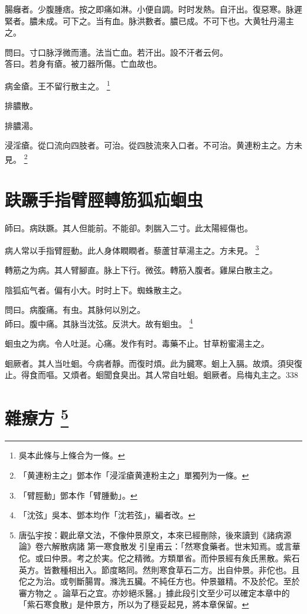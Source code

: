 腸癰者。少腹腫痞。按之即痛如淋。小便自調。时时发熱。自汗出。復惡寒。脉遲緊者。膿未成。可下之。当有血。脉洪數者。膿已成。不可下也。大黄牡丹湯主之。

問曰。寸口脉浮微而濇。法当亡血。若汗出。設不汗者云何。\\
答曰。若身有瘡。被刀器所傷。亡血故也。

病金瘡。王不留行散主之。
	\footnote{吳本此條与上條合为一條。}

排膿散。

排膿湯。

浸淫瘡。從口流向四肢者。可治。從四肢流來入口者。不可治。黄連粉主之。{\scriptsize 方未見。}
	\footnote{「黄連粉主之」鄧本作「浸淫瘡黄連粉主之」單獨列为一條。}

\chapter{趺蹶手指臂脛轉筋狐疝蛔虫}

師曰。病趺蹶。其人但能前。不能卻。刺腨入二寸。此太陽經傷也。

病人常以手指臂脛動。此人身体瞤瞤者。藜蘆甘草湯主之。{\scriptsize 方未見。}
	\footnote{
		「臂脛動」鄧本作「臂腫動」。
	}

轉筋之为病。其人臂腳直。脉上下行。微弦。轉筋入腹者。雞屎白散主之。

陰狐疝气者。偏有小大。时时上下。蜘蛛散主之。

問曰。病腹痛。有虫。其脉何以別之。\\
師曰。腹中痛。其脉当沈弦。反洪大。故有蛔虫。
	\footnote{「沈弦」吳本、鄧本均作「沈若弦」，編者改。}

蛔虫之为病。令人吐涎。心痛。发作有时。毒藥不止。甘草粉蜜湯主之。

蛔厥者。其人当吐蛔。今病者靜。而復时煩。此为臓寒。蛔上入膈。故煩。須臾復止。得食而嘔。又煩者。蛔聞食臭出。其人常自吐蛔。蛔厥者。烏梅丸主之。338

\chapter{雜療方
	\footnote{
		唐弘宇按：觀此章文法，不像仲景原文，本來已經刪除，後來讀到《諸病源{\sungtpii 𠊱}論》卷六解散病諸{\sungtpii 𠊱}第一寒食散发{\sungtpii 𠊱}引皇甫云：「然寒食藥者。世末知焉。或言華佗。或曰仲景。考之於実。佗之精微。方類單省。而仲景經有矦氏黑散。紫石英方。皆數種相出入。節度略同。然則寒食草石二方。出自仲景。非佗也。且佗之为治。或刳斷腸胃。滌洗五臟。不純任方也。仲景雖精。不及於佗。至於審方物之{\sungtpii 𠊱}。論草石之宜。亦妙絕乑醫。」據此段引文至少可以確定本章中的「紫石寒食散」是仲景方，所以为了穩妥起見，將本章保留。
	}
}

